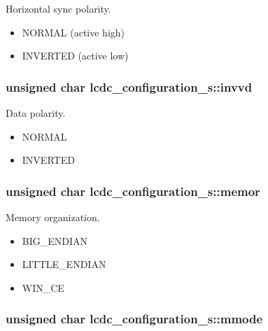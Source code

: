 Horizontal sync polarity. 

\begin{itemize}
\item NORMAL (active high) \item INVERTED (active low) \end{itemize}
\hypertarget{structlcdc__configuration__s_0b8a7d6d1459c92c2f675506a203deb8}{
\subsubsection[{invvd}]{\setlength{\rightskip}{0pt plus 5cm}unsigned char {\bf lcdc\_\-configuration\_\-s::invvd}}}
\label{structlcdc__configuration__s_0b8a7d6d1459c92c2f675506a203deb8}


Data polarity. 

\begin{itemize}
\item NORMAL \item INVERTED \end{itemize}
\hypertarget{structlcdc__configuration__s_1f7b0da117a8f440c6073a09b8e22ab8}{
\subsubsection[{memor}]{\setlength{\rightskip}{0pt plus 5cm}unsigned char {\bf lcdc\_\-configuration\_\-s::memor}}}
\label{structlcdc__configuration__s_1f7b0da117a8f440c6073a09b8e22ab8}


Memory organization. 

\begin{itemize}
\item BIG\_\-ENDIAN \item LITTLE\_\-ENDIAN \item WIN\_\-CE \end{itemize}
\hypertarget{structlcdc__configuration__s_aa3546e4cd6be09fb7e6eaf23a49543b}{
\subsubsection[{mmode}]{\setlength{\rightskip}{0pt plus 5cm}unsigned char {\bf lcdc\_\-configuration\_\-s::mmode}}}
\label{structlcdc__configuration__s_aa3546e4cd6be09fb7e6eaf23a49543b}


